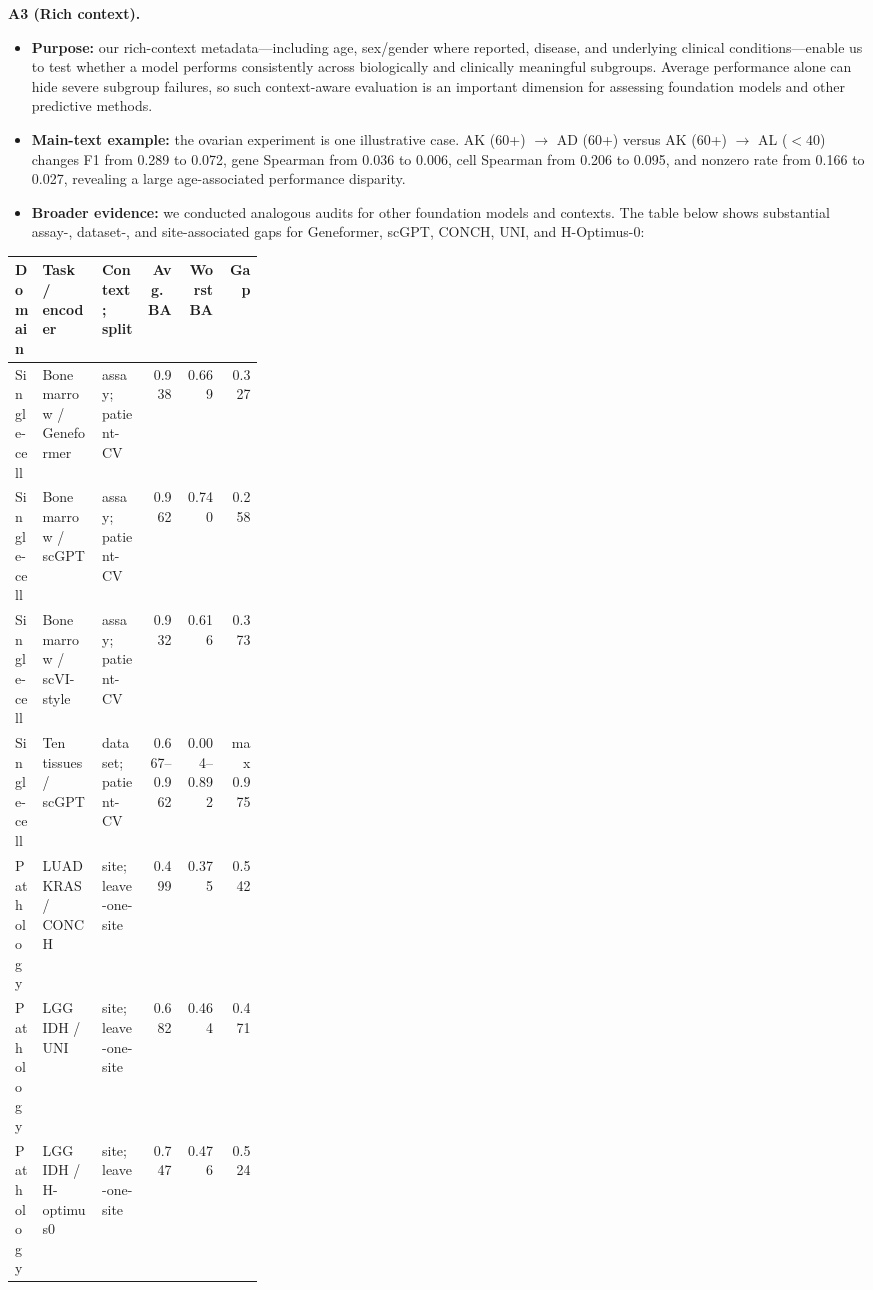 \documentclass[10pt]{article}
\begin{document}
\textbf{A3 (Rich context).}
\begin{itemize}
\item \textbf{Purpose:} our rich-context metadata---including age, sex/gender
where reported, disease, and underlying clinical conditions---enable us to test
whether a model performs consistently across biologically and clinically
meaningful subgroups. Average performance alone can hide severe subgroup
failures, so such context-aware evaluation is an important dimension for
assessing foundation models and other predictive methods.
\item \textbf{Main-text example:} the ovarian experiment is one illustrative
case. AK (60+) \(\to\) AD (60+) versus AK (60+) \(\to\) AL (\(<40\)) changes F1
from 0.289 to 0.072, gene Spearman from 0.036 to 0.006, cell Spearman from 0.206
to 0.095, and nonzero rate from 0.166 to 0.027, revealing a large age-associated
performance disparity.
\item \textbf{Broader evidence:} we conducted analogous audits for other
foundation models and contexts. The table below shows substantial assay-,
dataset-, and site-associated gaps for Geneformer, scGPT, CONCH, UNI, and
H-Optimus-0:
\end{itemize}

\begin{center}
\begingroup
\scriptsize
\setlength{\tabcolsep}{2pt}
\renewcommand{\arraystretch}{1.05}
\begin{tabularx}{\linewidth}{@{}p{0.11\linewidth}X p{0.18\linewidth}rrr@{}}
\toprule
Domain & Task / encoder & Context; split & Avg.\ BA & Worst BA & Gap \\
\midrule
Single-cell & Bone marrow / Geneformer & assay; patient-CV
& 0.938 & 0.669 & 0.327 \\
Single-cell & Bone marrow / scGPT & assay; patient-CV
& 0.962 & 0.740 & 0.258 \\
Single-cell & Bone marrow / scVI-style & assay; patient-CV
& 0.932 & 0.616 & 0.373 \\
Single-cell & Ten tissues / scGPT & dataset; patient-CV
& 0.667--0.962 & 0.004--0.892 & max 0.975 \\
Pathology & LUAD KRAS / CONCH & site; leave-one-site
& 0.499 & 0.375 & 0.542 \\
Pathology & LGG IDH / UNI & site; leave-one-site
& 0.682 & 0.464 & 0.471 \\
Pathology & LGG IDH / H-optimus0 & site; leave-one-site
& 0.747 & 0.476 & 0.524 \\
\bottomrule
\end{tabularx}
\endgroup
\end{center}
\end{document}
